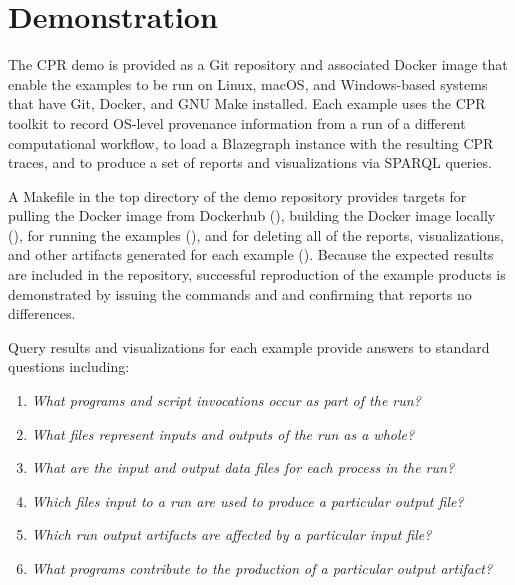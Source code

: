 \section{Demonstration}

The CPR demo is provided as a Git repository and associated Docker image that enable the examples to be run on Linux, macOS, and Windows-based systems that have Git, Docker, and GNU Make installed. Each example uses the CPR toolkit to record OS-level provenance information from a run of a different computational workflow, to load a Blazegraph instance with the resulting CPR traces, and to produce a set of reports and visualizations via SPARQL queries.
 
A Makefile in the top directory of the demo repository provides targets for pulling the Docker image from Dockerhub (), building the Docker image locally (), for running the examples (), and for deleting all of the reports, visualizations, and other artifacts generated for each example (). Because the expected results are included in the repository, successful reproduction of the example products is demonstrated by issuing the commands  and  and confirming that  reports no differences.

Query results and visualizations for each example provide answers to standard questions including:
\begin{enumerate}
\item \emph{What programs and script invocations occur as part of the run?}
\item \emph{What files represent inputs and outputs of the run as a whole?}
\item \emph{What are the input and output data files for each process in the run?}
\item \emph{Which files input to a run are used to produce a particular output file?}
\item \emph{Which run output artifacts are affected by a particular input file?}
\item \emph{What programs contribute to the production of a particular output artifact?}
\end{enumerate}

